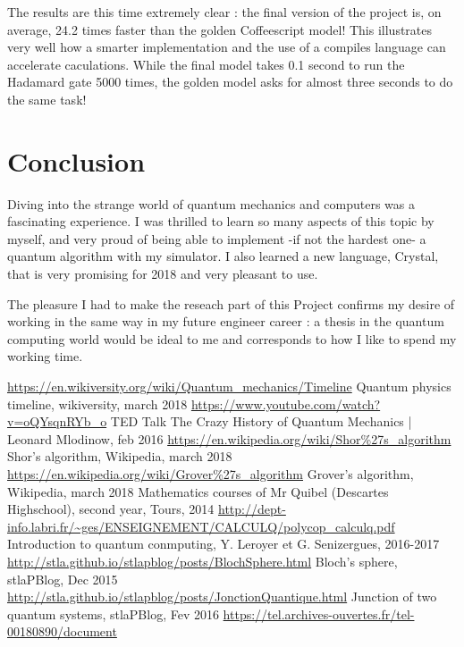 \documentclass[a4paper,12pt]{report}
\newcommand{\para}[1]{\par{#1}\\}
\begin{document}
\para{
    The results are this time extremely clear : the final version of the project is, on average, 24.2 times faster than the golden Coffeescript model! This illustrates very well how a smarter implementation and the use of a compiles language can accelerate caculations. While the final model takes 0.1 second to run the Hadamard gate 5000 times, the golden model asks for almost three seconds to do the same task!
}

%
%

\chapter{Conclusion}

\para{
    Diving into the strange world of quantum mechanics and computers was a fascinating experience. I was thrilled to learn so many aspects of this topic by myself, and very proud of being able to implement -if not the hardest one- a quantum algorithm with my simulator. I also learned a new language, Crystal, that is very promising for 2018 and very pleasant to use.
}

\para{
    The pleasure I had to make the reseach part of this Project confirms my desire of working in the same way in my future engineer career : a thesis in the quantum computing world would be ideal to me and corresponds to how I like to spend my working time.
}

%
%


\begin{thebibliography}{1}

     \url{https://en.wikiversity.org/wiki/Quantum_mechanics/Timeline} Quantum physics timeline, wikiversity, march 2018
     \url{https://www.youtube.com/watch?v=oQYsqnRYb_o} TED Talk The Crazy History of Quantum Mechanics | Leonard Mlodinow, feb 2016
     \url{https://en.wikipedia.org/wiki/Shor%27s_algorithm} Shor's algorithm, Wikipedia, march 2018
     \url{https://en.wikipedia.org/wiki/Grover%27s_algorithm} Grover's algorithm, Wikipedia, march 2018
     Mathematics courses of Mr Quibel (Descartes Highschool), second year, Tours, 2014
	 \url{http://dept-info.labri.fr/~ges/ENSEIGNEMENT/CALCULQ/polycop_calculq.pdf} Introduction to quantum conmputing, Y. Leroyer et G. Senizergues, 2016-2017
	 \url{http://stla.github.io/stlapblog/posts/BlochSphere.html} Bloch's sphere, stlaPBlog, Dec 2015
	 \url{http://stla.github.io/stlapblog/posts/JonctionQuantique.html} Junction of two quantum systems, stlaPBlog, Fev 2016
	 \url{https://tel.archives-ouvertes.fr/tel-00180890/document}
\end{thebibliography}
\end{document}
